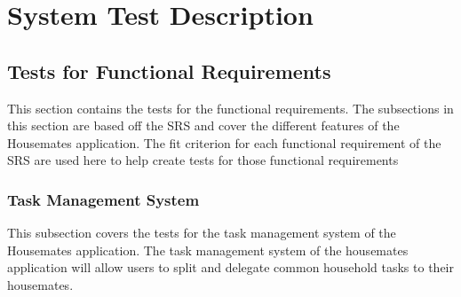 \documentclass[12pt, titlepage]{article}
\begin{document}

\section{System Test Description}
	
\subsection{Tests for Functional Requirements}

This section contains the tests for the functional requirements. The subsections in this section are based off the SRS and cover the different features of the Housemates application. The fit criterion for each functional requirement of the SRS are used here to help create tests for those functional requirements



\subsubsection{Task Management System}

This subsection covers the tests for the task management system of the Housemates application. The task management system of the housemates application will allow users to split and delegate common household tasks to their housemates.

\end{document}

